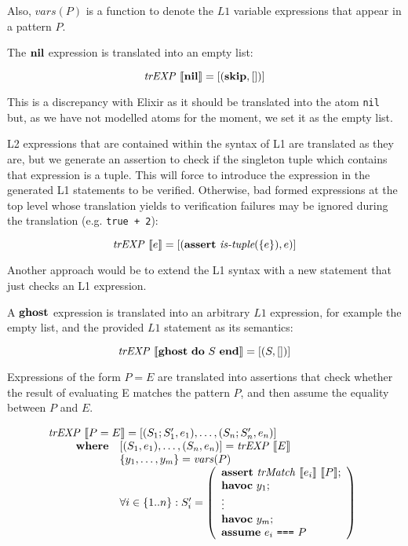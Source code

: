 Also, $\mathit{vars}(P)$ is a function to denote the $L1$ variable expressions
that appear in a pattern $P$.

The $\textbf{nil}$ expression is translated into an empty list:

\[
\mathit{trEXP}~\llbracket\textbf{nil}\rrbracket = [(\textbf{skip}, [])]
\]

This is a discrepancy with Elixir as it should be translated into the atom 
\verb|nil| but, as we have not modelled atoms for the moment, we set it as the
empty list.

L2 expressions that are contained within the syntax of L1 are translated as they
are, but we generate an assertion to check if the singleton tuple which contains
that expression is a tuple. This will force to introduce the expression in the
generated L1 statements to be verified. Otherwise, bad formed expressions at the
top level whose translation yields to verification failures may be ignored
during the translation (e.g. \verb|true + 2|):

\[
\mathit{trEXP}~\llbracket e\rrbracket = [(\textbf{assert}~\textit{is\mbox{-}tuple}(\{e\}), e)]
\]

Another approach would be to extend the L1 syntax with a new statement that just
checks an L1 expression.

A $\textbf{ghost}$ expression is translated into an arbitrary $L1$ expression, for
example the empty list, and the provided $L1$ statement as its semantics:

\[
\mathit{trEXP}~\llbracket\textbf{ghost}~\textbf{do}~S~\textbf{end}\rrbracket = [(S, [])]
\]

Expressions of the form $P = E$ are translated into assertions that check
whether the result of evaluating E matches the pattern $P$, and then assume the
equality between $P$ and $E$.

\[
\begin{array}{l}
\mathit{trEXP}~\llbracket P = E\rrbracket = [(S_1;S_1',e_1), \dots, (S_n;S_n', e_n)] \\
\qquad 
\begin{array}{ll}
\textbf{where} & [(S_1,e_1),\dots,(S_n, e_n)] = \mathit{trEXP}~\llbracket E\rrbracket \\
& \{y_1, \ldots, y_m\} = \mathit{vars}(P) \\
& \forall i \in \{1..n\}: S_i' = \left(
\begin{array}{l}
\textbf{assert}~\mathit{trMatch}~\llbracket e_i\rrbracket~\llbracket P\rrbracket;\\
\textbf{havoc}~y_1;\\
\vdots\\
\textbf{havoc}~y_m;\\
\textbf{assume}~e_i ~\texttt{===}~ P\\
\end{array}
\right)
\end{array}
\end{array}
\]

